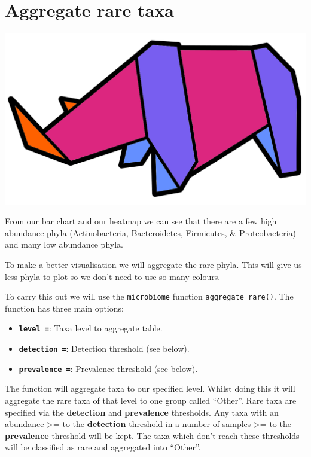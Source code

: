 \documentclass[
]{book}
\providecommand{\tightlist}{%
  \setlength{\itemsep}{0pt}\setlength{\parskip}{0pt}}
\begin{document}
\hypertarget{aggregateraretaxa}{%
\section{Aggregate rare taxa}\label{aggregateraretaxa}}

\includegraphics{figures/origami_rhino.png}

From our bar chart and our heatmap we can see that there are a few high abundance phyla (Actinobacteria, Bacteroidetes, Firmicutes, \& Proteobacteria) and many low abundance phyla.

To make a better visualisation we will aggregate the rare phyla.
This will give us less phyla to plot so we don't need to use so many colours.

To carry this out we will use the \texttt{microbiome} function \texttt{aggregate\_rare()}.
The function has three main options:

\begin{itemize}
\tightlist
\item
  \textbf{\texttt{level\ =}}: Taxa level to aggregate table.
\item
  \textbf{\texttt{detection\ =}}: Detection threshold (see below).
\item
  \textbf{\texttt{prevalence\ =}}: Prevalence threshold (see below).
\end{itemize}

The function will aggregate taxa to our specified level.
Whilst doing this it will aggregate the rare taxa of that level to one group called ``Other''.
Rare taxa are specified via the \textbf{detection} and \textbf{prevalence} thresholds.
Any taxa with an abundance \textgreater= to the \textbf{detection} threshold in a number of samples \textgreater= to the \textbf{prevalence} threshold will be kept.
The taxa which don't reach these thresholds will be classified as rare and aggregated into ``Other''.
\end{document}
